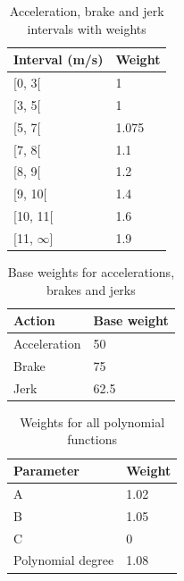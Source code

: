 \begin{table}
    \begin{tabular}{ll}
    \textbf{Interval (m/s)} & \textbf{Weight} \\ \hline
    {[}0, 3{[}              & 1               \\
    {[}3, 5{[}              & 1               \\
    {[}5, 7{[}              & 1.075           \\
    {[}7, 8{[}              & 1.1             \\
    {[}8, 9{[}              & 1.2             \\
    {[}9, 10{[}             & 1.4             \\
    {[}10, 11{[}            & 1.6             \\
    {[}11, $\infty${]}      & 1.9             \\ \hline
    \end{tabular}
    \caption{Acceleration, brake and jerk intervals with weights}
    \label{tab:accelerationvalues}
\end{table}

\begin{table}
    \begin{tabular}{ll}
    \textbf{Action} & \textbf{Base weight} \\ \hline
    Acceleration    & 50                   \\
    Brake           & 75                   \\
    Jerk            & 62.5                 \\ \hline
    \end{tabular}
    \caption{Base weights for accelerations, brakes and jerks}
    \label{tab:basevalues}
\end{table}

\begin{table}
    \begin{tabular}{ll}
    \textbf{Parameter} & \textbf{Weight} \\ \hline
    A                  & 1.02            \\
    B                  & 1.05            \\
    C                  & 0               \\
    Polynomial degree  & 1.08            \\ \hline
    \end{tabular}
    \caption{Weights for all polynomial functions}
    \label{tab:polyvalues}
\end{table}